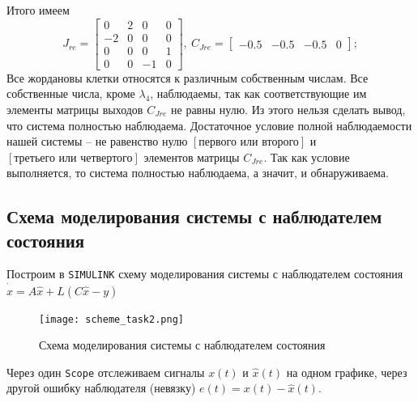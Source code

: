 \documentclass[a4paper, 12pt]{article}
\begin{document}
    Итого имеем
    $$
    J_{re}=\begin{bmatrix}
        0    &2   &0    &0\\
       -2   &0    &0   &0\\
        0   &0    &0    &1\\
       0   &0   &-1   &0
    \end{bmatrix},\ C_{Jre}=\begin{bmatrix}
        -0.5   &-0.5   &-0.5         &0
    \end{bmatrix};
    $$
    Все жордановы клетки относятся к различным собственным числам. Все собственные числа, кроме
    $\lambda_4$, наблюдаемы, так как соответствующие им элементы матрицы выходов $C_{Jre}$
    не равны нулю. Из этого нельзя сделать вывод, что система полностью наблюдаема. Достаточное
    условие полной наблюдаемости нашей системы -- не равенство нулю $\left[\text{первого или второго}\right]$
    и $\left[\text{третьего или четвертого}\right]$ элементов матрицы $C_{Jre}$. Так как условие
    выполняется, то система полностью наблюдаема, а значит, и обнаруживаема.


    \subsection{Схема моделирования системы с наблюдателем состояния}
    Построим в \texttt{SIMULINK} схему моделирования системы с наблюдателем состояния
    $\dot{\hat{x}}=A\hat{x}+L\left(C\hat{x}-y\right)$
    \begin{figure}[H]
        \centering
        \texttt{[image: scheme\_task2.png]}
        \captionsetup{skip=0pt}
        \caption{Схема моделирования системы с наблюдателем состояния}
        \label{fig:scheme_task2}
    \end{figure}
    \noindent Через один \texttt{Scope} отслеживаем сигналы $x(t)\text{ и }\hat{x}(t)$ на одном графике,
    через другой ошибку наблюдателя (невязку) $e(t)=x(t)-\hat{x}(t)$.
\end{document}

